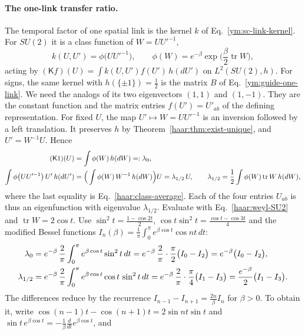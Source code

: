 \paragraph{The one-link transfer ratio.}
The temporal factor of one spatial link is the kernel $k$ of
Eq.~\eqref{ym:sc-link-kernel}. For $SU(2)$ it is a class function of
$W=UU'^{-1}$,
\begin{equation}\label{ym:guide-su2-kernel}
 k(U,U')=\phi\big(UU'^{-1}\big),\qquad
 \phi(W)=e^{-\beta}\exp\Big(\frac\beta2\operatorname{tr}W\Big),
\end{equation}
acting by $(\mathsf Kf)(U)=\int k(U,U')f(U')\,h(dU')$ on $L^2(SU(2),h)$.
For signs, the same kernel with $h(\{\pm1\})=\tfrac12$ is the matrix $B$
of Eq.~\eqref{ym:guide-one-link}. We need the analogs of its two
eigenvectors $(1,1)$ and $(1,-1)$. They are the constant function and the
matrix entries $f(U')=U'_{ab}$ of the defining representation. For fixed
$U$, the map $U'\mapsto W=UU'^{-1}$ is an inversion followed by a left
translation. It preserves $h$ by Theorem~\ref{haar:thm:exist-unique}, and
$U'=W^{-1}U$. Hence
\begin{align}
 (\mathsf K1)(U)&=\int\phi(W)\,h(dW)=:\lambda_0,\notag\\
 \int\phi\big(UU'^{-1}\big)\,U'\,h(dU')
 &=\Big(\int\phi(W)\,W^{-1}\,h(dW)\Big)U=\lambda_{1/2}\,U,\qquad
 \lambda_{1/2}=\frac12\int\phi(W)\operatorname{tr}W\,h(dW),
 \label{ym:guide-su2-eigen}
\end{align}
where the last equality is Eq.~\eqref{haar:class-average}. Each of the four
entries $U_{ab}$ is thus an eigenfunction with eigenvalue $\lambda_{1/2}$.
Evaluate with Eq.~\eqref{haar:weyl-SU2} and $\operatorname{tr}W=2\cos t$.
Use $\sin^2t=\frac{1-\cos2t}2$, $\cos t\sin^2t=\frac{\cos t-\cos3t}4$
and the modified Bessel functions
$I_n(\beta)=\frac1\pi\int_0^\pi e^{\beta\cos t}\cos nt\,dt$:
\begin{align}
 \lambda_0&=e^{-\beta}\,\frac2\pi\int_0^\pi e^{\beta\cos t}\sin^2t\,dt
 =e^{-\beta}\,\frac2\pi\cdot\frac\pi2\big(I_0-I_2\big)
 =e^{-\beta}\big(I_0-I_2\big),\notag\\
 \lambda_{1/2}&=e^{-\beta}\,\frac2\pi\int_0^\pi e^{\beta\cos t}\cos t\,\sin^2t\,dt
 =e^{-\beta}\,\frac2\pi\cdot\frac\pi4\big(I_1-I_3\big)
 =\frac{e^{-\beta}}2\big(I_1-I_3\big).\label{ym:guide-su2-bessel}
\end{align}
The differences reduce by the recurrence
$I_{n-1}-I_{n+1}=\frac{2n}\beta I_n$ for $\beta>0$. To obtain it, write
$\cos(n-1)t-\cos(n+1)t=2\sin nt\sin t$ and
$\sin t\,e^{\beta\cos t}=-\frac1\beta\frac{d}{dt}e^{\beta\cos t}$, and
